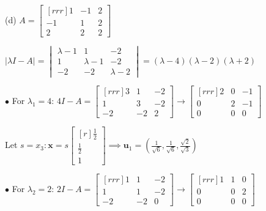 \documentclass{article}
\newcommand\ddfrac[2]{\frac{\displaystyle #1}{\displaystyle #2}}
\begin{document}
    \begin{minipage}{0.43\linewidth}
        (d) $A = \begin{bmatrix}[rrr]
            1 & -1 & 2 \\
            -1 & 1 & 2 \\
            2 & 2 & 2 
        \end{bmatrix} $

        $| \lambda I - A| = \begin{vmatrix}
            \lambda  - 1 & 1 & -2 \\
            1 & \lambda  - 1 & -2 \\
            -2 & -2 & \lambda  - 2 
        \end{vmatrix} = ( \lambda  - 4 )( \lambda  - 2 )( \lambda  + 2 )$

        $\bullet$ For $ \lambda _1 = 4$: $4I - A = \begin{bmatrix}[rrr]
            3 & 1 & -2 \\
            1 & 3 & -2 \\
            -2 & -2 & 2 
        \end{bmatrix} \to \begin{bmatrix}[rrr]
            2 & 0 & -1 \\
            0 & 2 & -1 \\
            0 & 0 & 0 
        \end{bmatrix}$

        Let $s = x_3: \textbf{x} = s \begin{bmatrix}[r]
            \frac{1}{2} \\
            \frac{1}{2}  \\
            1 
        \end{bmatrix} \implies \textbf{u}_1 = \left( \ddfrac{1}{\sqrt{6}} , \ddfrac{1}{\sqrt{6}} , \ddfrac{\sqrt{2}}{\sqrt{3}}  \right) $

        $\bullet$ For $ \lambda _2 = 2$: $2I - A = \begin{bmatrix}[rrr]
            1 & 1 & -2 \\
            1 & 1 & -2 \\
            -2 & -2 & 0 
        \end{bmatrix} \to \begin{bmatrix}[rrr]
            1 & 1 & 0 \\
            0 & 0 & 2 \\
            0 & 0 & 0 
        \end{bmatrix} $


\end{minipage}
\end{document}
